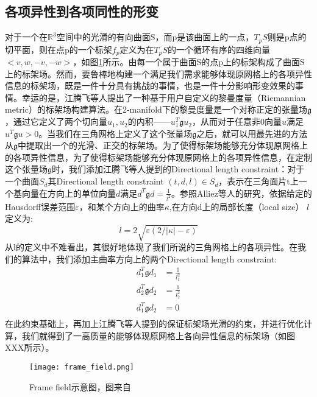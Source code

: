 \subsection{各项异性到各项同性的形变}
对于一个在$\mathbb{R}^3$空间中的光滑的有向曲面S，而p是该曲面上的一点，$T_pS$则是p点的切平面，则在点p的一个标架$f_p$定义为在$T_pS$的一个循环有序的四维向量$<v,w,−v,−w>$，如图\ref{fig:frame-field}所示。由每一个属于曲面S的点p上的标架构成了曲面S上的标架场。然而，要鲁棒地构建一个满足我们需求能够体现原网格上的各项异性信息的标架场，既是一件十分具有挑战的事情，也是一件十分影响形变效果的事情。幸运的是，江腾飞等人提出了一种基于用户自定义的黎曼度量（Riemannian metric）的标架场构建算法\cite{frame-field-gen}。在2-manifold下的黎曼度量是一个对称正定的张量场$\mathfrak{g}$，通过它定义了两个切向量$u_1, u_2$的内积——$u_1^T \mathfrak{g} u_2$，从而对于任意非0向量$u$满足$u^T \mathfrak{g} u>0$。当我们在三角网格上定义了这个张量场$\mathfrak{g}$之后，就可以用最先进的方法从$\mathfrak{g}$中提取出一个的光滑、正交的标架场。为了使得标架场能够充分体现原网格上的各项异性信息，为了使得标架场能够充分体现原网格上的各项异性信息，在定制这个张量场$\mathfrak{g}$时，我们添加江腾飞等人提到的Directional length constraint：对于一个曲面$S_d$其Directional length constraint $(t, d, l) \in S_d$，表示在三角面片t上一个基向量在方向上的单位向量$d$满足$d^T \mathfrak{g} d = \frac{1}{l^2}$。参照Alliez等人的研究\cite{remesh-length}，依据给定的Hausdorff误差范围$\varepsilon$，和某个方向上的曲率$\kappa$,在方向d上的局部长度（local size） $l$定义为:
\begin{equation}
  l = 2 \sqrt{\varepsilon(2/|\kappa| - \varepsilon)}
\end{equation}
从l的定义中不难看出，其很好地体现了我们所说的三角网格上的各项异性。在我们的算法中，我们添加主曲率方向上的两个Directional length constraint:
\begin{equation}
  \begin{split}
    d_1^T \mathfrak{g} d_1 &= \frac{1}{l_1^2}\\
    d_2^T \mathfrak{g} d_2 &= \frac{1}{l_2^2}\\
    d_1^T \mathfrak{g} d_2 &= 0\\
  \end{split}
\end{equation}
在此约束基础上，再加上江腾飞等人提到的保证标架场光滑的约束，并进行优化计算，我们就得到了一高质量的能够体现原网格上各向异性信息的标架场（如图XXX所示）。\par
\begin{figure}[htbp]
    \centering
    \texttt{[image: frame\_field.png]}
    \caption{Frame field示意图，图来自\cite{isotopic-appro}}
    \label{fig:frame-field}
\end{figure}

